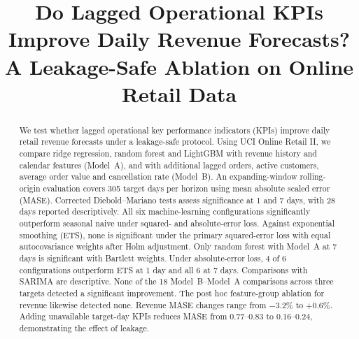 \documentclass[conference]{IEEEtran}
\begin{document}
\title{Do Lagged Operational KPIs Improve Daily Revenue Forecasts? A Leakage-Safe Ablation on Online Retail Data}

\author{
\and
{}
}

\maketitle

\begin{abstract}
We test whether lagged operational key performance indicators (KPIs) improve daily retail revenue forecasts
under a leakage-safe protocol. Using UCI Online Retail II, we compare ridge regression, random forest and
LightGBM with revenue history and calendar features (Model~A), and with additional lagged orders, active
customers, average order value and cancellation rate (Model~B). An expanding-window rolling-origin
evaluation covers 305 target days per horizon using mean absolute scaled error (MASE).
Corrected Diebold--Mariano tests assess significance at 1 and 7 days, with 28 days reported descriptively.
All six machine-learning configurations significantly outperform seasonal naive under squared- and
absolute-error loss. Against exponential smoothing (ETS), none is significant under the primary
squared-error loss with equal autocovariance weights after Holm adjustment. Only random forest with Model~A at
7 days is significant with Bartlett weights. Under absolute-error loss, 4 of 6 configurations outperform
ETS at 1 day and all 6 at 7 days. Comparisons with SARIMA are descriptive.
None of the 18 Model~B--Model~A comparisons across three targets detected a significant improvement.
The post hoc feature-group ablation for revenue likewise detected none. Revenue MASE changes range
from $-3.2\%$ to $+0.6\%$. Adding unavailable target-day KPIs reduces MASE from 0.77--0.83 to
0.16--0.24, demonstrating the effect of leakage.
\end{abstract}
\end{document}
